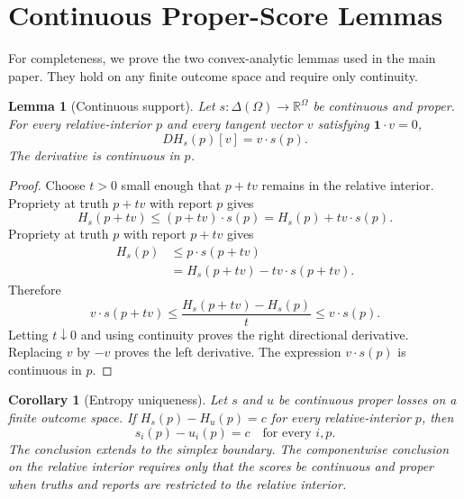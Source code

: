 \documentclass[twoside]{article}
\newtheorem{corollary}[theorem]{Corollary}
\newtheorem{lemma}[theorem]{Lemma}
\newcommand{\1}{\mathbf 1}
\begin{document}
\section{Continuous Proper-Score Lemmas}
\label{app:convex}

For completeness, we prove the two convex-analytic lemmas used in the main
paper. They hold on any finite outcome space and require only continuity.

\begin{lemma}[Continuous support]
\label{lem:supp-continuous}
Let $s:\Delta(\Omega)\to\mathbb R^\Omega$ be continuous and proper. For
every relative-interior $p$ and every tangent vector $v$ satisfying
$\1\cdot v=0$,
\begin{equation}
 D H_s(p)[v]=v\cdot s(p).
 \label{eq:supp-directional}
\end{equation}
The derivative is continuous in $p$.
\end{lemma}

\begin{proof}
Choose $t>0$ small enough that $p+tv$ remains in the relative interior.
Propriety at truth $p+tv$ with report $p$ gives
\begin{equation*}
 H_s(p+tv)\leq(p+tv)\cdot s(p)
 =H_s(p)+t v\cdot s(p).
\end{equation*}
Propriety at truth $p$ with report $p+tv$ gives
\begin{align*}
 H_s(p)&\leq p\cdot s(p+tv)\\
 &=H_s(p+tv)-t v\cdot s(p+tv).
\end{align*}
Therefore
\begin{equation}
 v\cdot s(p+tv)\leq
 \frac{H_s(p+tv)-H_s(p)}{t}
 \leq v\cdot s(p).
 \label{eq:supp-squeeze}
\end{equation}
Letting $t\downarrow0$ and using continuity proves the right directional
derivative. Replacing $v$ by $-v$ proves the left derivative. The expression
$v\cdot s(p)$ is continuous in $p$.
\end{proof}

\begin{corollary}[Entropy uniqueness]
\label{cor:supp-unique}
Let $s$ and $u$ be continuous proper losses on a finite outcome space. If
$H_s(p)-H_u(p)=c$ for every relative-interior $p$, then
\begin{equation}
 s_i(p)-u_i(p)=c
 \quad\text{for every }i,p.
 \label{eq:supp-unique}
\end{equation}
The conclusion extends to the simplex boundary.
The componentwise conclusion on the relative interior requires only that the
scores be continuous and proper when truths and reports are restricted to the
relative interior.
\end{corollary}
\end{document}
